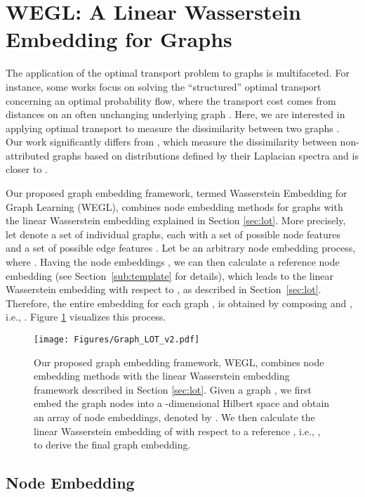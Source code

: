 \documentclass[table]{article} \usepackage{iclr2021_conference,times}
\begin{document}
\section{WEGL: A Linear Wasserstein Embedding for Graphs}


The application of the optimal transport problem to graphs is multifaceted.  For instance, some works focus on solving the ``structured'' optimal transport concerning an optimal probability flow, where the transport cost comes from distances on an often unchanging underlying graph
\citep{leonard2016lazy,essid2018quadratically,titouan2019}.  Here, we are interested in applying optimal transport to measure the dissimilarity between two graphs \citep{maretic2019got,togninalli2019wasserstein,dong2020copt}. Our work significantly differs from \citep{maretic2019got,dong2020copt}, which measure the dissimilarity between non-attributed graphs based on distributions defined by their Laplacian spectra and is closer to \citep{togninalli2019wasserstein}.  

Our proposed graph embedding framework, termed Wasserstein Embedding for Graph Learning (WEGL), combines node embedding methods for graphs with the linear Wasserstein embedding explained in Section \ref{sec:lot}. More precisely, let  denote a set of  individual graphs, each with a set of possible node features  and a set of possible edge features .
Let  be an arbitrary node embedding process, where . Having the node embeddings , we can then calculate a reference node embedding  (see Section~\ref{sub:template} for details), which leads to the linear Wasserstein embedding  with respect to , as described in Section~\ref{sec:lot}. Therefore, the entire embedding for each graph , is obtained by composing  and , i.e., . Figure \ref{fig:graph_lot} visualizes this process. 
\begin{figure}[t]
\centering
\texttt{[image: Figures/Graph\_LOT\_v2.pdf]}
\caption{Our proposed graph embedding framework, WEGL, combines node embedding methods with the linear Wasserstein embedding framework described in Section \ref{sec:lot}. Given a graph , we first embed the graph nodes into a -dimensional Hilbert space and obtain an array of node embeddings, denoted by .
We then calculate the linear Wasserstein embedding of  with respect to a reference , i.e., , to derive the final graph embedding.}
\label{fig:graph_lot}
\vspace{-.1in}
\end{figure}

\subsection{Node Embedding}
\end{document}
